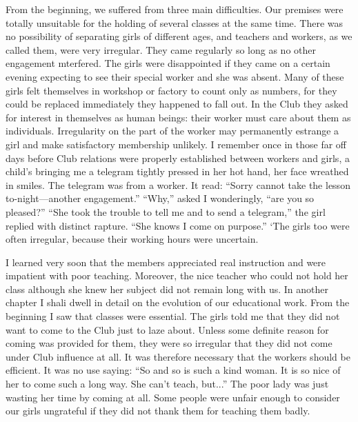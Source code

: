 From the beginning, we suffered from three main difficulties.
Our premises were totally unsuitable for the
holding of several classes at the same time. There was no
possibility of separating girls of different ages, and
teachers and workers, as we called them, were very
irregular. They came regularly so long as no other engagement
mterfered. The girls were disappointed if they
came on a certain evening expecting to see their special
worker and she was absent. Many of these girls felt themselves
in workshop or factory to count only as numbers,
for they could be replaced immediately they happened
to fall out. In the Club they asked for interest in themselves
as human beings: their worker must care about
them as individuals. Irregularity on the part of the
worker may permanently estrange a girl and make
satisfactory membership unlikely. I remember once in
those far off days before Club relations were properly
established between workers and girls, a child’s bringing
me a telegram tightly pressed in her hot hand, her face
wreathed in smiles. The telegram was from a worker.
It read: “Sorry cannot take the lesson to-night—another
engagement.” “Why,” asked I wonderingly, “are you
so pleased?” “She took the trouble to tell me and to
send a telegram,” the girl replied with distinct rapture.
“She knows I come on purpose.” ‘The girls too were
often irregular, because their working hours were
uncertain.

I learned very soon that the members appreciated real
instruction and were impatient with poor teaching. Moreover,
the nice teacher who could not hold her class
although she knew her subject did not remain long with
us. In another chapter I shali dwell in detail on the
evolution of our educational work. From the beginning
I saw that classes were essential. The girls told me that
they did not want to come to the Club just to laze about.
Unless some definite reason for coming was provided for
them, they were so irregular that they did not come under
Club influence at all. It was therefore necessary that the
workers should be efficient. It was no use saying: “So
and so is such a kind woman. It is so nice of her to come
such a long way. She can’t teach, but...” The poor
lady was just wasting her time by coming at all. Some
people were unfair enough to consider our girls ungrateful
if they did not thank them for teaching them badly.

